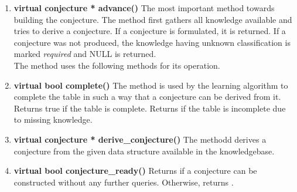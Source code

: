 \begin{enumerate}
 \item \textbf{virtual conjecture * advance()} \vskip 1pt
	The most important method towards building the conjecture. The method first gathers all knowledge available and tries to derive a conjecture. If a conjecture is formulated, it is returned. If a conjecture was not produced, the knowledge having unknown classification is marked \emph{required} and NULL is returned. \\
	The method uses the following methods for its operation.

 \item \textbf{virtual bool complete()} \vskip 1pt
	The method is used by the learning algorithm to complete the table in such a way that a conjecture can be derived from it. Returns true if the table is complete. Returns \false if the table is incomplete due to missing knowledge. 

 \item \textbf{virtual conjecture * derive\_conjecture()} \vskip 1pt
	The methodd derives a conjecture from the given data structure available in the knowledgebase. 

 \item \textbf{virtual bool conjecture\_ready()} \vskip 1pt
	Returns \true if a conjecture can be constructed without any further queries. Otherwise, returns \false.
\end{enumerate}






